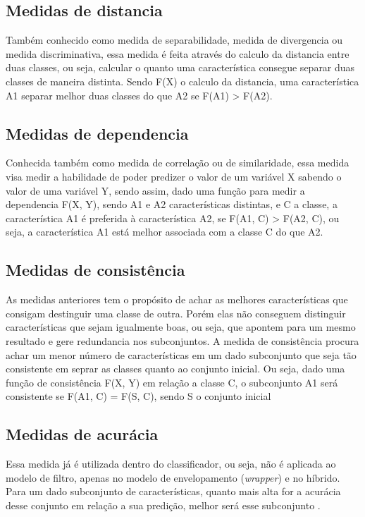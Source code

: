 \subsection{Medidas de distancia}

Também conhecido como medida de separabilidade, medida de divergencia ou medida discriminativa, essa medida é feita através do calculo da distancia entre duas classes, ou seja, calcular o quanto uma característica consegue  separar duas classes de maneira distinta. Sendo F(X) o calculo da distancia, uma característica A1 separar melhor duas classes do que A2 se F(A1) > F(A2). \cite{huan_1998}

\subsection{Medidas de dependencia}

Conhecida também como medida de correlação ou de similaridade, essa medida visa medir a habilidade de poder predizer o valor de um variável X sabendo o valor de uma variável Y, sendo assim, dado uma função para medir a dependencia F(X, Y), sendo A1 e A2 características distintas, e C a classe, a característica A1 é preferida à característica A2, se F(A1, C) > F(A2, C), ou seja, a característica A1 está melhor associada com a classe C do que A2. \cite{huan_1998, liu_2005}

\subsection{Medidas de consistência}

As medidas anteriores tem o propósito de achar as melhores características que consigam destinguir uma classe de outra. Porém elas não conseguem distinguir características que sejam igualmente boas, ou seja, que apontem para um mesmo resultado e gere redundancia nos subconjuntos. A medida de consistência procura achar um menor número de características em um dado subconjunto que seja tão consistente em seprar as classes quanto ao conjunto inicial. Ou seja, dado uma função de consistência F(X, Y) em relação a classe C, o subconjunto A1 será consistente se F(A1, C) = F(S, C), sendo S o conjunto inicial \cite{liu_2005}

\subsection{Medidas de acurácia}

Essa medida já é utilizada dentro do classificador, ou seja, não é aplicada ao modelo de filtro, apenas no modelo de envelopamento (\textit{wrapper}) e no híbrido. Para um dado subconjunto de características, quanto mais alta for a acurácia desse conjunto em relação a sua predição, melhor será esse subconjunto \cite{huan_1998}.

